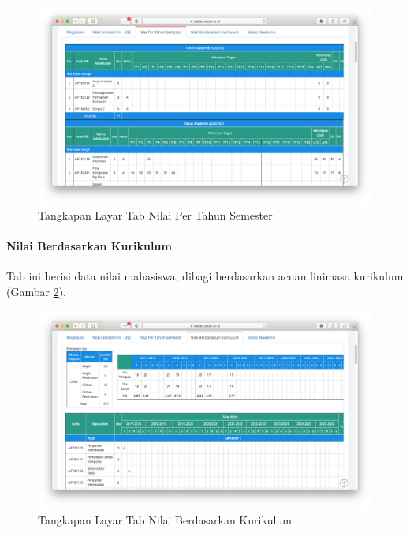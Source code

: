 \begin{figure}[H]
    \centering
    \includegraphics[scale=0.35]{Gambar/siakad_akademik_nilaipertahunsemester.png}
    \caption{Tangkapan Layar Tab Nilai Per Tahun Semester}
    \label{fig:3_siakad_akademik_nilaipertahunsemester}
\end{figure}

\paragraph{Nilai Berdasarkan Kurikulum} Tab ini berisi data nilai mahasiswa, dibagi berdasarkan acuan linimasa kurikulum (Gambar \ref{fig:3_siakad_akademik_nilaiberdasarkankurikulum}).

\begin{figure}[H]
    \centering
    \includegraphics[scale=0.35]{Gambar/siakad_akademik_nilaiberdasarkankurikulum.png}
    \caption{Tangkapan Layar Tab Nilai Berdasarkan Kurikulum}
    \label{fig:3_siakad_akademik_nilaiberdasarkankurikulum}
\end{figure}

